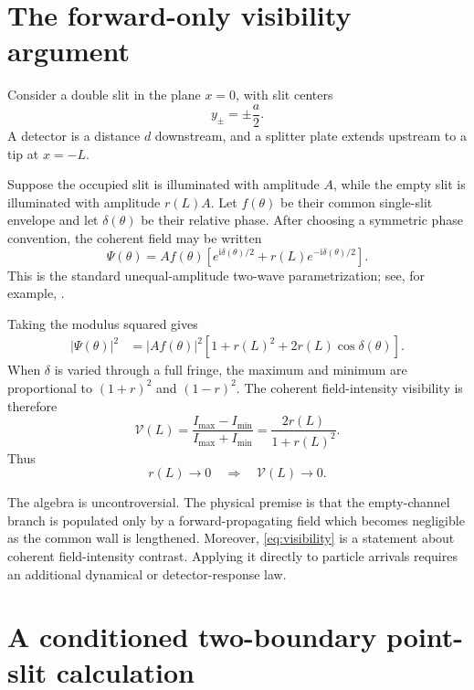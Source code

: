 \documentclass[11pt]{article}
\newcommand{\ii}{\mathrm{i}}
\begin{document}
\section{The forward-only visibility argument}

Consider a double slit in the plane $x=0$, with slit centers
\begin{equation}
 y_\pm=\pm\frac{a}{2}.
\end{equation}
A detector is a distance $d$ downstream, and a splitter plate extends upstream to a tip at $x=-L$.

Suppose the occupied slit is illuminated with amplitude $A$, while the empty slit is illuminated with amplitude $r(L)A$.  Let $f(\theta)$ be their common single-slit envelope and let $\delta(\theta)$ be their relative phase.  After choosing a symmetric phase convention, the coherent field may be written
\begin{equation}
 \Psi(\theta)
 =A f(\theta)
 \left[
 e^{\ii\delta(\theta)/2}
 +r(L)e^{-\ii\delta(\theta)/2}
 \right].
 \label{eq:forwardfield}
\end{equation}
This is the standard unequal-amplitude two-wave parametrization; see, for example, \cite{Daniel2022}.

Taking the modulus squared gives
\begin{align}
 |\Psi(\theta)|^2
 &=|A f(\theta)|^2
 \left[
 1+r(L)^2+2r(L)\cos\delta(\theta)
 \right].
 \label{eq:forwardintensity}
\end{align}
When $\delta$ is varied through a full fringe, the maximum and minimum are proportional to $(1+r)^2$ and $(1-r)^2$.  The coherent field-intensity visibility is therefore
\begin{equation}
 \mathcal V(L)
 =\frac{I_{\max}-I_{\min}}{I_{\max}+I_{\min}}
 =\frac{2r(L)}{1+r(L)^2}.
 \label{eq:visibility}
\end{equation}
Thus
\begin{equation}
 r(L)\longrightarrow0
 \quad\Longrightarrow\quad
 \mathcal V(L)\longrightarrow0.
\end{equation}

The algebra is uncontroversial.  The physical premise is that the empty-channel branch is populated only by a forward-propagating field which becomes negligible as the common wall is lengthened.  Moreover, \eqref{eq:visibility} is a statement about coherent field-intensity contrast.  Applying it directly to particle arrivals requires an additional dynamical or detector-response law.

\section{A conditioned two-boundary point-slit calculation}
\end{document}
